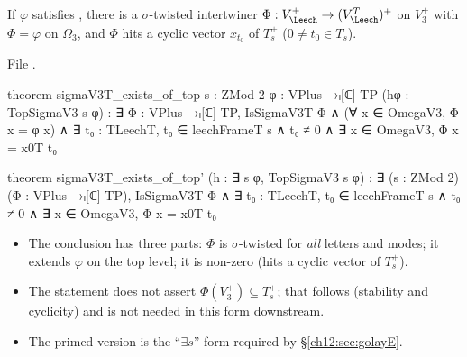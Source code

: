 \begin{theorem}\label{ch12:thm:sigmaV3T_exists_of_top}
If $\varphi$ satisfies , there is a $\sigma$-twisted intertwiner
$\Phi:V_\Leech^+\to(V_\Leech^T)^+$ on $V_3^+$ with $\Phi=\varphi$ on $\Omega_3$, and $\Phi$ hits a cyclic
vector $x_{t_0}$ of $T_s^+$ ($0\neq t_0\in T_s$).
\end{theorem}
File .
\begin{leancode}
theorem sigmaV3T_exists_of_top {s : ZMod 2} {φ : VPlus →ₗ[ℂ] TP} (hφ : TopSigmaV3 s φ) :
    ∃ Φ : VPlus →ₗ[ℂ] TP, IsSigmaV3T Φ ∧ (∀ x ∈ OmegaV3, Φ x = φ x) ∧
      ∃ t₀ : TLeechT, t₀ ∈ leechFrameT s ∧ t₀ ≠ 0 ∧ ∃ x ∈ OmegaV3, Φ x = x0T t₀

theorem sigmaV3T_exists_of_top' (h : ∃ s φ, TopSigmaV3 s φ) :
    ∃ (s : ZMod 2) (Φ : VPlus →ₗ[ℂ] TP), IsSigmaV3T Φ ∧
      ∃ t₀ : TLeechT, t₀ ∈ leechFrameT s ∧ t₀ ≠ 0 ∧ ∃ x ∈ OmegaV3, Φ x = x0T t₀
\end{leancode}
\begin{dictionary}
\begin{itemize}
\item The conclusion has three parts: $\Phi$ is $\sigma$-twisted for \emph{all} letters and modes; it
  extends $\varphi$ on the top level; it is non-zero (hits a cyclic vector of $T_s^+$).
\item The statement does not assert $\Phi(V_3^+)\subseteq T_s^+$; that follows (stability and
  cyclicity) and is not needed in this form downstream.
\item The primed version is the ``$\exists s$'' form required by \S\ref{ch12:sec:golayE}.
\end{itemize}
\end{dictionary}

